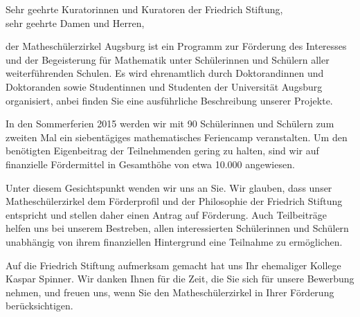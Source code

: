 \documentclass{zirkelbrief}
\begin{document}
\renewcommand{\anschrift}{%
      Friedrich Stiftung \\
      Schiffgraben 42 \\
      30175 Hannover \\}
\renewcommand{\datum}{\today}
\renewcommand{\betreff}{Matheschülerzirkel Augsburg}
\renewcommand{\absender}{%
      \textbf{Ingo Blechschmidt} \\
      \ \\
      Lehrstuhl für Algebra und Zahlentheorie \\
      Universitätsstr. 14 \\
      86159 Augsburg \\
      \ \\
      Telefon \> +49 (0) 821 598 -- 5601 \\
      Telefax \> +49 (0) 821 598 -- 2090 \\
      \textsf{blechschmidt@math.uni-augsburg.de} \\}

\makeletterhead

Sehr geehrte Kuratorinnen und Kuratoren der Friedrich Stiftung, \\
sehr geehrte Damen und Herren,

der Matheschülerzirkel Augsburg ist ein Programm zur Förderung
des Interesses und der Begeisterung für Mathematik unter Schülerinnen und
Schülern aller weiterführenden Schulen. Es wird ehrenamtlich durch Doktorandinnen und
Doktoranden sowie Studentinnen und Studenten der Universität Augsburg
organisiert, anbei finden Sie eine ausführliche Beschreibung unserer Projekte.

In den Sommerferien 2015 werden wir mit 90 Schülerinnen und Schülern zum
zweiten Mal ein siebentägiges mathematisches Feriencamp veranstalten. Um den
benötigten Eigenbeitrag der Teilnehmenden gering zu halten, sind wir auf
finanzielle Fördermittel in Gesamthöhe von etwa 10.000 \texteuro{} angewiesen.

Unter diesem Gesichtspunkt wenden wir uns an Sie. Wir glauben, dass unser
Mathe\-schü\-ler\-zir\-kel dem Förderprofil und der Philosophie der Friedrich
Stiftung entspricht und stellen daher einen Antrag auf Förderung. Auch Teilbeiträge
helfen uns bei unserem Bestreben, allen interessierten Schülerinnen und
Schülern unabhängig von ihrem finanziellen Hintergrund eine Teilnahme zu
ermöglichen.

Auf die Friedrich Stiftung aufmerksam gemacht hat uns Ihr  
ehemaliger Kollege Kaspar Spinner. Wir danken Ihnen für die Zeit, die Sie sich
für unsere Bewerbung nehmen, und freuen uns, wenn Sie den Matheschülerzirkel
in Ihrer Förderung berücksichtigen.
\end{document}
